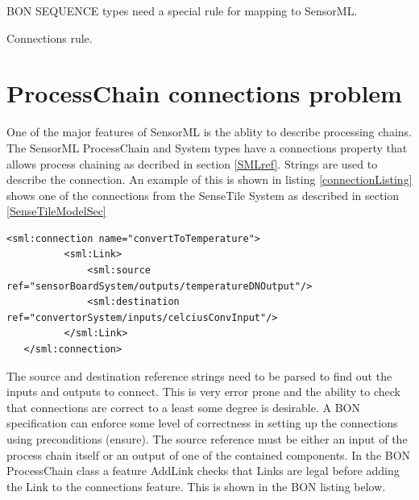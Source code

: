\documentclass[]{final_report}
\begin{document}
BON SEQUENCE types need a special rule for mapping to SensorML.

Connections rule.

\section{ProcessChain connections problem}
One of the major features of SensorML is the ablity to describe processing chains. The SensorML ProcessChain and System types have a connections property that allows process chaining as decribed in section \ref{SMLref}. Strings are used to describe the connection. An example of this is shown in listing \ref{connectionListing} shows one of the connections from the SenseTile System as described in section \ref{SenseTileModelSec}
\begin{lstlisting}[label=connectionListing,caption=SenseTile System connectionconvertToTemperature]
   <sml:connection name="convertToTemperature">
          <sml:Link>
              <sml:source ref="sensorBoardSystem/outputs/temperatureDNOutput"/>
              <sml:destination ref="convertorSystem/inputs/celciusConvInput"/>
          </sml:Link>
   </sml:connection>

\end{lstlisting}

The source and destination reference strings need to be parsed to find out the inputs and outputs to connect. This is very error prone and the ability to check that connections are correct to a least some degree is desirable. A BON specification can enforce some level of correctness in setting up the connections using preconditions (ensure). The source reference must be either an input of the process chain itself or an output of one of the contained components. In the BON ProcessChain class a feature AddLink checks that Links are legal before adding the Link to the connections feature. This is shown in the BON listing below.
\end{document}
